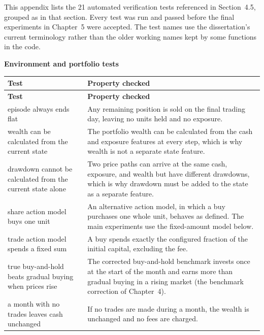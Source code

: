 
This appendix lists the 21 automated verification tests referenced in
Section~4.5, grouped as in that section. Every test was run and passed
before the final experiments in Chapter~5 were accepted. The test names
use the dissertation's current terminology rather than the older working
names kept by some functions in the code.

\begingroup\small
\renewcommand{\arraystretch}{0.92}
\newcommand{\testgroup}[1]{\par\vspace{5pt}\noindent\textbf{#1}\par\nopagebreak\vspace{1pt}}
\renewcommand{\rowsep}{\arrayrulecolor{black!22}\specialrule{0.35pt}{1pt}{1.5pt}\arrayrulecolor{black}}

\testgroup{Environment and portfolio tests}

\begin{longtable}{@{}p{}p{}@{}}
\toprule
\textbf{Test} & \textbf{Property checked} \\
\midrule
\endfirsthead
\toprule
\textbf{Test} & \textbf{Property checked} \\
\midrule
\endhead
\bottomrule
\endlastfoot
episode always ends flat & Any remaining position is sold on the final
  trading day, leaving no units held and no exposure. \\
\rowsep
wealth can be calculated from the current state & The portfolio wealth
  can be calculated from the cash and exposure features at every step,
  which is why wealth is not a separate state feature. \\
\rowsep
drawdown cannot be calculated from the current state alone & Two price
  paths can arrive at the same cash, exposure, and wealth but have
  different drawdowns, which is why drawdown must be added to the state
  as a separate feature. \\
\rowsep
share action model buys one unit & An alternative action model, in which
  a buy purchases one whole unit, behaves as defined. The main
  experiments use the fixed-amount model below. \\
\rowsep
trade action model spends a fixed sum & A buy spends exactly the
  configured fraction of the initial capital, excluding the fee. \\
\rowsep
true buy-and-hold beats gradual buying when prices rise & The corrected
  buy-and-hold benchmark invests once at the start of the month and earns
  more than gradual buying in a rising market (the benchmark correction
  of Chapter~4). \\
\rowsep
a month with no trades leaves cash unchanged & If no trades are made
  during a month, the wealth is unchanged and no fees are charged. \\
\end{longtable}

